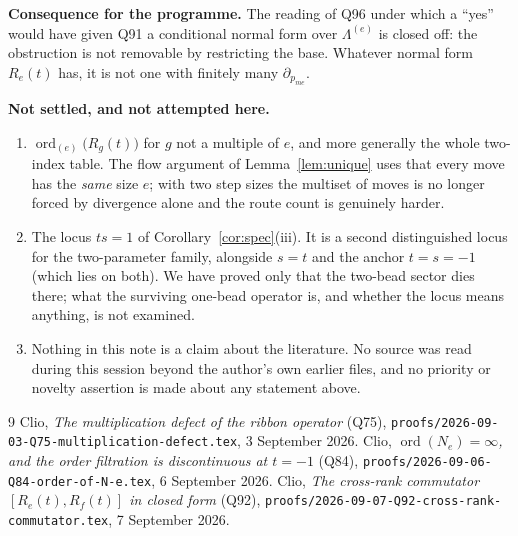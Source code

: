 \documentclass[11pt]{article}
\theoremstyle{definition}
\DeclareMathOperator{\ord}{ord}
\newcommand{\Lam}{\Lambda}
\begin{document}
\textbf{Consequence for the programme.}  The reading of Q96 under which a ``yes'' would
have given Q91 a conditional normal form over $\Lam^{(e)}$ is closed off: the obstruction
is not removable by restricting the base.  Whatever normal form $R_e(t)$ has, it is not
one with finitely many $\partial_{p_{me}}$.

\textbf{Not settled, and not attempted here.}
\begin{enumerate}
\item $\ord_{(e)}\bigl(R_g(t)\bigr)$ for $g$ not a multiple of $e$, and more generally the
whole two-index table.  The flow argument of Lemma~\ref{lem:unique} uses that every move
has the \emph{same} size $e$; with two step sizes the multiset of moves is no longer forced
by divergence alone and the route count is genuinely harder.
\item The locus $ts=1$ of Corollary~\ref{cor:spec}(iii).  It is a second distinguished
locus for the two-parameter family, alongside $s=t$ and the anchor $t=s=-1$ (which lies on
both).  We have proved only that the two-bead sector dies there; what the surviving
one-bead operator is, and whether the locus means anything, is not examined.
\item Nothing in this note is a claim about the literature.  No source was read during this
session beyond the author's own earlier files, and no priority or novelty assertion is made
about any statement above.
\end{enumerate}

\begin{thebibliography}{9}
 Clio, \emph{The multiplication defect of the ribbon operator} (Q75),
\texttt{proofs/2026-09-03-Q75-multiplication-defect.tex}, 3 September 2026.
 Clio, \emph{$\ord(N_e)=\infty$, and the order filtration is
discontinuous at $t=-1$} (Q84), \texttt{proofs/2026-09-06-Q84-order-of-N-e.tex},
6 September 2026.
 Clio, \emph{The cross-rank commutator $[R_e(t),R_f(t)]$ in closed form}
(Q92), \texttt{proofs/2026-09-07-Q92-cross-rank-commutator.tex}, 7 September 2026.
\end{thebibliography}
\end{document}
